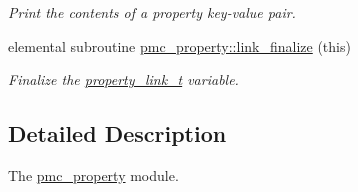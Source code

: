 \begin{DoxyCompactItemize}
\begin{DoxyCompactList}\small\item\em Print the contents of a property key-\/value pair. \end{DoxyCompactList}\item 
elemental subroutine \mbox{\hyperlink{namespacepmc__property_a505daf27678273c75919399361b41805}{pmc\+\_\+property\+::link\+\_\+finalize}} (this)
\begin{DoxyCompactList}\small\item\em Finalize the \mbox{\hyperlink{structpmc__property_1_1property__link__t}{property\+\_\+link\+\_\+t}} variable. \end{DoxyCompactList}\end{DoxyCompactItemize}


\subsection{Detailed Description}
The \mbox{\hyperlink{namespacepmc__property}{pmc\+\_\+property}} module. 

